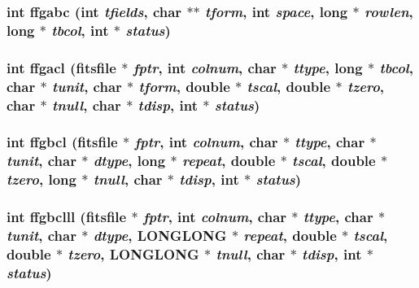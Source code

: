\subsubsection{\setlength{\rightskip}{0pt plus 5cm}int ffgabc (int {\em tfields}, char $\ast$$\ast$ {\em tform}, int {\em space}, long $\ast$ {\em rowlen}, long $\ast$ {\em tbcol}, int $\ast$ {\em status})}\label{fitsio_8h_c5fba60d67c46af10be7619df523ce11}


\subsubsection{\setlength{\rightskip}{0pt plus 5cm}int ffgacl (\bf{fitsfile} $\ast$ {\em fptr}, int {\em colnum}, char $\ast$ {\em ttype}, long $\ast$ {\em tbcol}, char $\ast$ {\em tunit}, char $\ast$ {\em tform}, double $\ast$ {\em tscal}, double $\ast$ {\em tzero}, char $\ast$ {\em tnull}, char $\ast$ {\em tdisp}, int $\ast$ {\em status})}\label{fitsio_8h_4bb154796602a968ef9110aa4fdb65ba}


\subsubsection{\setlength{\rightskip}{0pt plus 5cm}int ffgbcl (\bf{fitsfile} $\ast$ {\em fptr}, int {\em colnum}, char $\ast$ {\em ttype}, char $\ast$ {\em tunit}, char $\ast$ {\em dtype}, long $\ast$ {\em repeat}, double $\ast$ {\em tscal}, double $\ast$ {\em tzero}, long $\ast$ {\em tnull}, char $\ast$ {\em tdisp}, int $\ast$ {\em status})}\label{fitsio_8h_3ddad62e5a9a9a05e6276badb897bc96}


\subsubsection{\setlength{\rightskip}{0pt plus 5cm}int ffgbclll (\bf{fitsfile} $\ast$ {\em fptr}, int {\em colnum}, char $\ast$ {\em ttype}, char $\ast$ {\em tunit}, char $\ast$ {\em dtype}, \bf{LONGLONG} $\ast$ {\em repeat}, double $\ast$ {\em tscal}, double $\ast$ {\em tzero}, \bf{LONGLONG} $\ast$ {\em tnull}, char $\ast$ {\em tdisp}, int $\ast$ {\em status})}\label{fitsio_8h_a3e635921cb5dce7a25d020a6d1d85c4}



